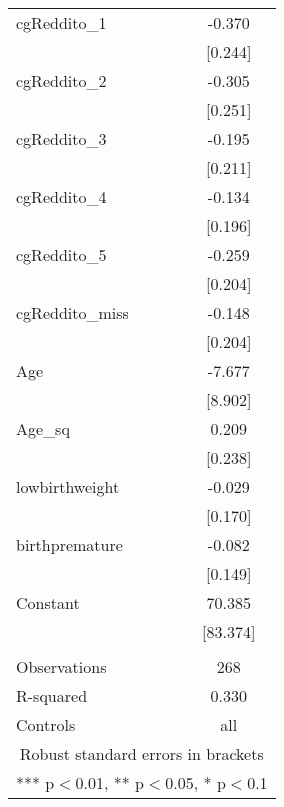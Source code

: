 \documentclass[]{article}
\begin{document}
\begin{tabular}{lc}
cgReddito\_1 & -0.370 \\
 & [0.244] \\
cgReddito\_2 & -0.305 \\
 & [0.251] \\
cgReddito\_3 & -0.195 \\
 & [0.211] \\
cgReddito\_4 & -0.134 \\
 & [0.196] \\
cgReddito\_5 & -0.259 \\
 & [0.204] \\
cgReddito\_miss & -0.148 \\
 & [0.204] \\
Age & -7.677 \\
 & [8.902] \\
Age\_sq & 0.209 \\
 & [0.238] \\
lowbirthweight & -0.029 \\
 & [0.170] \\
birthpremature & -0.082 \\
 & [0.149] \\
Constant & 70.385 \\
 & [83.374] \\
 &  \\
Observations & 268 \\
R-squared & 0.330 \\
 Controls & all \\ \hline
\multicolumn{2}{c}{ Robust standard errors in brackets} \\
\multicolumn{2}{c}{ *** p$<$0.01, ** p$<$0.05, * p$<$0.1} \\
\end{tabular}
\end{document}
